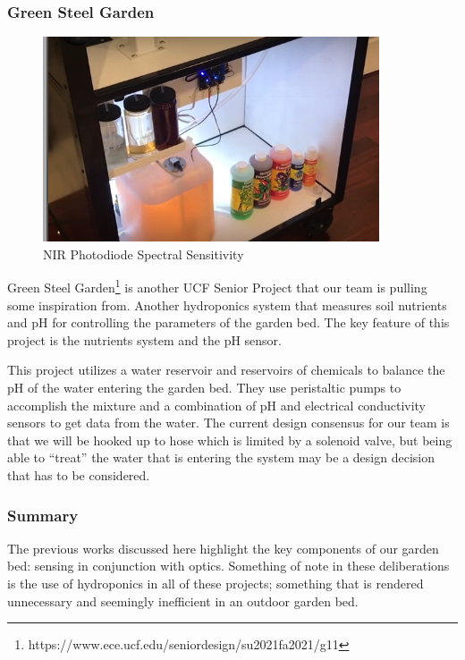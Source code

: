 \subsubsection{Green Steel Garden}

\begin{figure}[H]
    \caption{NIR Photodiode Spectral Sensitivity}
    \centering
    \includegraphics[width=\textwidth]{images/3.1.6Pic.png}
\end{figure}

Green Steel Garden\footnote{https://www.ece.ucf.edu/seniordesign/su2021fa2021/g11} is another UCF Senior Project that our team is pulling some inspiration from. Another hydroponics system that measures soil nutrients and pH for controlling the parameters of the garden bed. The key feature of this project is the nutrients system and the pH sensor.

This project utilizes a water reservoir and reservoirs of chemicals to balance the pH of the water entering the garden bed. They use peristaltic pumps to accomplish the mixture and a combination of pH and electrical conductivity sensors to get data from the water. The current design consensus for our team is that we will be hooked up to hose which is limited by a solenoid valve, but being able to ``treat'' the water that is entering the system may be a design decision that has to be considered.

\subsubsection{Summary}

The previous works discussed here highlight the key components of our garden bed: sensing in conjunction with optics. Something of note in these deliberations is the use of hydroponics in all of these projects; something that is rendered unnecessary and seemingly inefficient in an outdoor garden bed.

